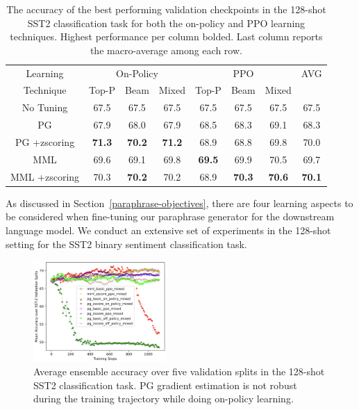 \documentclass[11pt]{article}
\begin{document}
\begin{table}
\centering
\caption{The accuracy of the best performing validation checkpoints in the 128-shot SST2 classification task for both the on-policy and PPO learning techniques. Highest performance per column bolded. Last column reports the macro-average among each row.}
\begin{tabular}{ c | c c c | c c c | c}
\hline
Learning & \multicolumn{3}{c|}{On-Policy} & \multicolumn{3}{c|}{PPO} & AVG \\
Technique & \small{Top-P} & \small{Beam} & \small{Mixed} & \small{Top-P} & \small{Beam} & \small{Mixed} & \\
\hline
No Tuning & \small67.5 & \small67.5 & \small67.5 & \small67.5 & \small67.5 & \small67.5 & \small67.5\\
\hline
PG & \small67.9 & \small68.0 & \small67.9 & \small68.5 & \small68.3 & \small69.1 & \small68.3\\
PG \small +zscoring & \small\textbf{71.3} & \small\textbf{70.2} & \small\textbf{71.2} & \small68.9 & \small68.8 & \small69.8 & \small70.0 \\
\hline
MML & \small69.6 & \small69.1 & \small69.8 & \small\textbf{69.5} & \small69.9 & \small70.5 & \small69.7 \\
MML \small +zscoring & \small70.3 & \small\textbf{70.2} & \small70.2 & \small68.9 & \small\textbf{70.3} & \small\textbf{70.6} & \small\textbf{70.1}\\
\hline
\end{tabular}
\label{maximum-curves-on-ppo}
\end{table}

As discussed in Section~\ref{paraphrase-objectives}, there are four learning aspects to be considered when fine-tuning our paraphrase generator for the downstream language model. We conduct an extensive set of experiments in the 128-shot setting for the SST2 binary sentiment classification task. 

\begin{figure}[h]
\begin{center}
\includegraphics[width=0.45\textwidth]{mml_pg_comparisons.png}
\end{center}
\caption{Average ensemble accuracy over five validation splits in the 128-shot SST2 classification task. PG gradient estimation is not robust during the training trajectory while doing on-policy learning.}
\label{pg_divergence}
\end{figure}
\end{document}
